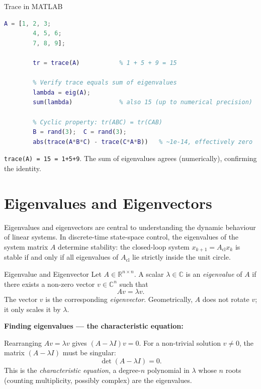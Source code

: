 \begin{examplebox}{Trace in MATLAB}
	\begin{lstlisting}[language=Matlab]
		A = [1, 2, 3;
		4, 5, 6;
		7, 8, 9];
		
		tr = trace(A)           % 1 + 5 + 9 = 15
		
		% Verify trace equals sum of eigenvalues
		lambda = eig(A);
		sum(lambda)             % also 15 (up to numerical precision)
		
		% Cyclic property: tr(ABC) = tr(CAB)
		B = rand(3);  C = rand(3);
		abs(trace(A*B*C) - trace(C*A*B))   % ~1e-14, effectively zero
	\end{lstlisting}
	\solution
	\texttt{trace(A) = 15 = 1+5+9}.  The sum of eigenvalues agrees
	(numerically), confirming the identity.
\end{examplebox}

\section{Eigenvalues and Eigenvectors}
\label{sec:app_eig}

Eigenvalues and eigenvectors are central to understanding the dynamic
behaviour of linear systems.  In discrete-time state-space control,
the eigenvalues of the system matrix $A$ determine stability: the
closed-loop system $x_{k+1} = A_\mathrm{cl} x_k$ is stable if and
only if all eigenvalues of $A_\mathrm{cl}$ lie strictly inside the
unit circle.

\begin{defnbox}{Eigenvalue and Eigenvector}
	Let $A \in \mathbb{R}^{n\times n}$.  A scalar $\lambda \in \mathbb{C}$
	is an \emph{eigenvalue} of $A$ if there exists a non-zero vector
	${v} \in \mathbb{C}^n$ such that
	\[
	A{v} = \lambda {v}.
	\]
	The vector $v$ is the corresponding \emph{eigenvector}.
	Geometrically, $A$ does not rotate ${v}$; it only scales it by
	$\lambda$.
\end{defnbox}

\textbf{Finding eigenvalues — the characteristic equation:}

Rearranging $A{v} = \lambda{v}$ gives
$(A - \lambda I){v} = {0}$.  For a non-trivial solution
${v} \neq {0}$, the matrix $(A-\lambda I)$ must be
singular:
\[
\det(A - \lambda I) = 0.
\]
This is the \emph{characteristic equation}, a degree-$n$ polynomial
in $\lambda$ whose $n$ roots (counting multiplicity, possibly complex)
are the eigenvalues.

